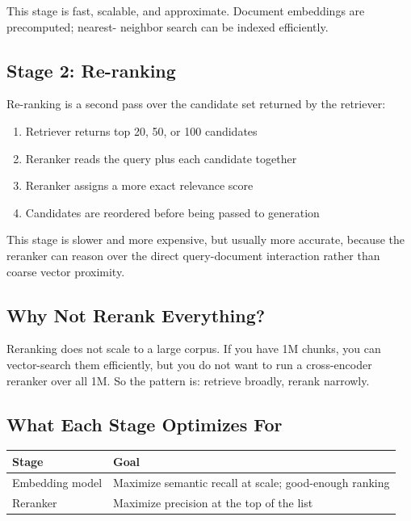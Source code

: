 This stage is fast, scalable, and approximate. Document embeddings are precomputed; nearest-
neighbor search can be indexed efficiently.

\subsection{Stage 2: Re-ranking}

Re-ranking is a second pass over the candidate set returned by the retriever:

\begin{enumerate}
    \item Retriever returns top 20, 50, or 100 candidates
    \item Reranker reads the query plus each candidate together
    \item Reranker assigns a more exact relevance score
    \item Candidates are reordered before being passed to generation
\end{enumerate}

This stage is slower and more expensive, but usually more accurate, because the reranker can
reason over the direct query-document interaction rather than coarse vector proximity.

\subsection{Why Not Rerank Everything?}

Reranking does not scale to a large corpus. If you have 1M chunks, you can vector-search them
efficiently, but you do not want to run a cross-encoder reranker over all 1M. So the pattern
is: retrieve broadly, rerank narrowly.

\subsection{What Each Stage Optimizes For}

\begin{center}
\begin{tabular}{ll}
\toprule
\textbf{Stage} & \textbf{Goal} \\
\midrule
Embedding model & Maximize semantic recall at scale; good-enough ranking \\
Reranker & Maximize precision at the top of the list \\
\bottomrule
\end{tabular}
\end{center}

